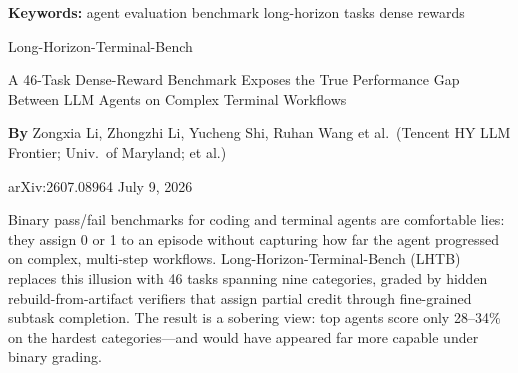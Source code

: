 \documentclass[10pt,twocolumn]{article}
\begin{document}
\setlength{\parindent}{0pt}
\setlength{\parskip}{4pt}

{\small\color{keywordgray}\textbf{Keywords:}
  agent evaluation \textbullet{}
  benchmark \textbullet{}
  long-horizon tasks \textbullet{}
  dense rewards}\par\vspace{4pt}

{\LARGE\bfseries\raggedright
  Long-Horizon-Terminal-Bench}\par\vspace{4pt}

{\large\itshape\raggedright
  A 46-Task Dense-Reward Benchmark Exposes the
  True Performance Gap Between LLM Agents on
  Complex Terminal Workflows}\par\vspace{6pt}

{\small\textbf{By} Zongxia Li, Zhongzhi Li, Yucheng Shi, Ruhan Wang
  et al.\ (Tencent HY LLM Frontier; Univ.\ of Maryland; et al.)}\par\vspace{2pt}

{\small\color{keywordgray}arXiv:2607.08964 \textbullet{}
  July 9, 2026}
\par\vspace{2pt}\noindent{\color{rulered}\rule{\columnwidth}{0.6pt}}\vspace{6pt}

Binary pass/fail benchmarks for coding and terminal agents are
comfortable lies: they assign 0 or 1 to an episode without capturing
how far the agent progressed on complex, multi-step workflows.
Long-Horizon-Terminal-Bench (LHTB) replaces this illusion with 46
tasks spanning nine categories, graded by hidden rebuild-from-artifact
verifiers that assign partial credit through fine-grained subtask
completion. The result is a sobering view: top agents score only
28--34\% on the hardest categories---and would have appeared far more
capable under binary grading.
\end{document}
